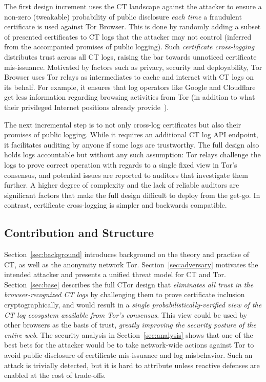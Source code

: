 The first design increment uses the CT landscape against the attacker to
ensure a non-zero (tweakable) probability of public disclosure \emph{each time}
a fraudulent certificate is used against Tor Browser.  This is done by randomly
adding a subset of presented certificates to CT logs that the attacker may not
control (inferred from the accompanied promises of public logging).  Such
\emph{certificate cross-logging} distributes trust across all CT logs, raising
the bar towards unnoticed certificate mis-issuance.  Motivated by factors such
as privacy, security and deployability, Tor Browser uses Tor relays as
intermediates to cache and interact with CT logs on its behalf.  For example, it
ensures that log operators like Google and Cloudflare get less information
regarding browsing activities from Tor (in addition to what their privileged
Internet positions already provide~\cite{1mtrack,TorDNS}).

The next incremental step is to not only cross-log certificates but also their
promises of public logging.  While it requires an additional CT log API
endpoint, it facilitates auditing by anyone if some logs are trustworthy.  The
full design also holds logs accountable but without any such assumption:
	Tor relays challenge the logs to prove correct operation with regards to a
		single fixed view in Tor's consensus, and
	potential issues are reported to auditors that investigate them further.
A higher degree of complexity and the lack of reliable auditors are significant
factors that make the full design difficult to deploy from the get-go.  In
contrast, certificate cross-logging is simpler and backwards compatible.

\subsection{Contribution and Structure}
Section~\ref{sec:background} introduces background on the theory and practise of
CT, as well as the anonymity network Tor.  Section~\ref{sec:adversary} motivates
the intended attacker and presents a unified threat model for CT and Tor.
Section~\ref{sec:base} describes the full CTor design that \emph{eliminates all
trust in the browser-recognized CT logs} by challenging them to prove
certificate inclusion cryptographically, and would result in a \emph{single
probabilistically-verified view of the CT log ecosystem available from Tor's
consensus}.  This view could be used by other browsers as the basis of trust,
\emph{greatly improving the security posture of the entire web}.  The security
analysis in Section~\ref{sec:analysis} shows that one of the best bets for the
attacker would be to take network-wide actions against Tor to avoid public
disclosure of certificate mis-issuance and log misbehavior.  Such an attack is
trivially detected, but it is hard to attribute unless reactive defenses are
enabled at the cost of trade-offs.

